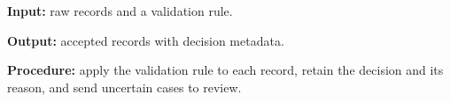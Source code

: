 \begin{algorithm}[t]
\caption{Sample data-preparation procedure}
\label{alg:sample-preparation}
\begin{minipage}{0.94\columnwidth}
\textbf{Input:} raw records and a validation rule.\par
\textbf{Output:} accepted records with decision metadata.\par
\textbf{Procedure:} apply the validation rule to each record, retain the decision and its reason, and send uncertain cases to review.
\end{minipage}
\end{algorithm}
